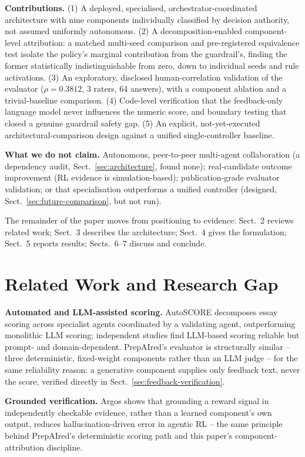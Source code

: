 \documentclass[runningheads]{llncs}
\begin{document}
\textbf{Contributions.} (1) A deployed, specialised, orchestrator-coordinated architecture with nine components individually classified by decision authority, not assumed uniformly autonomous. (2) A decomposition-enabled component-level attribution: a matched multi-seed comparison and pre-registered equivalence test isolate the policy's marginal contribution from the guardrail's, finding the former statistically indistinguishable from zero, down to individual seeds and rule activations. (3) An exploratory, disclosed human-correlation validation of the evaluator ($\rho = 0.3812$, 3 raters, 64 answers), with a component ablation and a trivial-baseline comparison. (4) Code-level verification that the feedback-only language model never influences the numeric score, and boundary testing that closed a genuine guardrail safety gap. (5) An explicit, not-yet-executed architectural-comparison design against a unified single-controller baseline.

\textbf{What we do not claim.} Autonomous, peer-to-peer multi-agent collaboration (a dependency audit, Sect.~\ref{sec:architecture}, found none); real-candidate outcome improvement (RL evidence is simulation-based); publication-grade evaluator validation; or that specialisation outperforms a unified controller (designed, Sect.~\ref{sec:future-comparison}, but not run).

The remainder of the paper moves from positioning to evidence: Sect.~2 reviews related work; Sect.~3 describes the architecture; Sect.~4 gives the formulation; Sect.~5 reports results; Sects.~6--7 discuss and conclude.

\section{Related Work and Research Gap}

\textbf{Automated and LLM-assisted scoring.} AutoSCORE \cite{key3} decomposes essay scoring across specialist agents coordinated by a validating agent, outperforming monolithic LLM scoring; independent studies \cite{key1,key2} find LLM-based scoring reliable but prompt- and domain-dependent. PrepAIred's evaluator is structurally similar -- three deterministic, fixed-weight components rather than an LLM judge -- for the same reliability reason: a generative component supplies only feedback text, never the score, verified directly in Sect.~\ref{sec:feedback-verification}.

\textbf{Grounded verification.} Argos \cite{key5} shows that grounding a reward signal in independently checkable evidence, rather than a learned component's own output, reduces hallucination-driven error in agentic RL -- the same principle behind PrepAIred's deterministic scoring path and this paper's component-attribution discipline.
\end{document}

